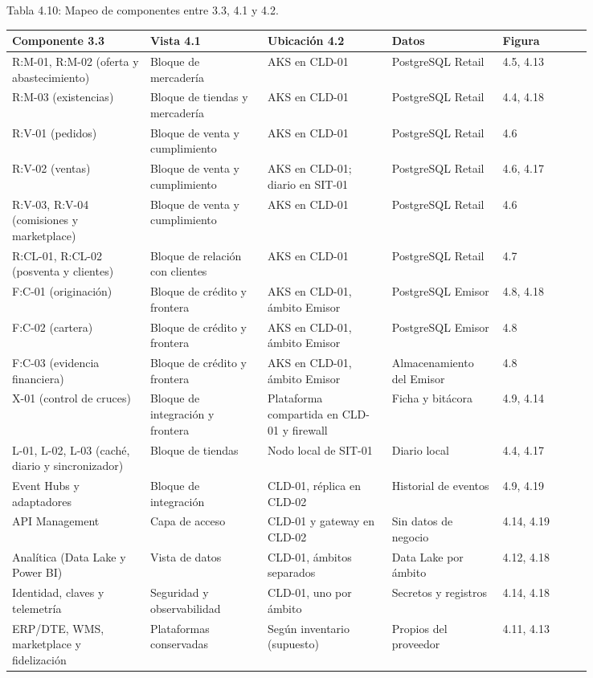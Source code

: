 \documentclass[11pt]{article}
\begin{document}
Tabla 4.10: Mapeo de componentes entre 3.3, 4.1 y 4.2.

\begin{longtable}{@{}p{0.20\linewidth}p{0.17\linewidth}p{0.18\linewidth}p{0.16\linewidth}p{0.13\linewidth}@{}}
\toprule Componente 3.3 & Vista 4.1 & Ubicación 4.2 & Datos & Figura \\
\midrule\endhead\bottomrule\endlastfoot
R:M-01, R:M-02 (oferta y abastecimiento) & Bloque de mercadería & AKS en CLD-01 & PostgreSQL Retail & 4.5, 4.13 \\
R:M-03 (existencias) & Bloque de tiendas y mercadería & AKS en CLD-01 & PostgreSQL Retail & 4.4, 4.18 \\
R:V-01 (pedidos) & Bloque de venta y cumplimiento & AKS en CLD-01 & PostgreSQL Retail & 4.6 \\
R:V-02 (ventas) & Bloque de venta y cumplimiento & AKS en CLD-01; diario en SIT-01 & PostgreSQL Retail & 4.6, 4.17 \\
R:V-03, R:V-04 (comisiones y marketplace) & Bloque de venta y cumplimiento & AKS en CLD-01 & PostgreSQL Retail & 4.6 \\
R:CL-01, R:CL-02 (posventa y clientes) & Bloque de relación con clientes & AKS en CLD-01 & PostgreSQL Retail & 4.7 \\
F:C-01 (originación) & Bloque de crédito y frontera & AKS en CLD-01, ámbito Emisor & PostgreSQL Emisor & 4.8, 4.18 \\
F:C-02 (cartera) & Bloque de crédito y frontera & AKS en CLD-01, ámbito Emisor & PostgreSQL Emisor & 4.8 \\
F:C-03 (evidencia financiera) & Bloque de crédito y frontera & AKS en CLD-01, ámbito Emisor & Almacenamiento del Emisor & 4.8 \\
X-01 (control de cruces) & Bloque de integración y frontera & Plataforma compartida en CLD-01 y firewall & Ficha y bitácora & 4.9, 4.14 \\
L-01, L-02, L-03 (caché, diario y sincronizador) & Bloque de tiendas & Nodo local de SIT-01 & Diario local & 4.4, 4.17 \\
Event Hubs y adaptadores & Bloque de integración & CLD-01, réplica en CLD-02 & Historial de eventos & 4.9, 4.19 \\
API Management & Capa de acceso & CLD-01 y gateway en CLD-02 & Sin datos de negocio & 4.14, 4.19 \\
Analítica (Data Lake y Power BI) & Vista de datos & CLD-01, ámbitos separados & Data Lake por ámbito & 4.12, 4.18 \\
Identidad, claves y telemetría & Seguridad y observabilidad & CLD-01, uno por ámbito & Secretos y registros & 4.14, 4.18 \\
ERP/DTE, WMS, marketplace y fidelización & Plataformas conservadas & Según inventario (supuesto) & Propios del proveedor & 4.11, 4.13 \\
\end{longtable}
\end{document}
